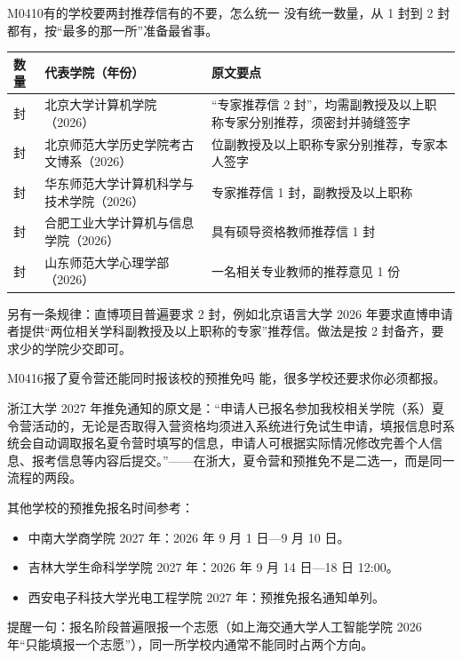 \begin{qa}{M0410}{有的学校要两封推荐信有的不要，怎么统一}
没有统一数量，从 1 封到 2 封都有，按“最多的那一所”准备最省事。

\par\vspace{2pt}\nobreak\begin{center}\footnotesize
\begin{tabularx}{\textwidth}{>{\raggedright\arraybackslash}X>{\raggedright\arraybackslash}X>{\raggedright\arraybackslash}X}
\toprule
\textbf{数量} & \textbf{代表学院（年份）} & \textbf{原文要点} \\ \midrule
2 封 & 北京大学计算机学院（2026） & “专家推荐信 2 封”，均需副教授及以上职称专家分别推荐，须密封并骑缝签字 \\
2 封 & 北京师范大学历史学院考古文博系（2026） & 2 位副教授及以上职称专家分别推荐，专家本人签字 \\
1 封 & 华东师范大学计算机科学与技术学院（2026） & 专家推荐信 1 封，副教授及以上职称 \\
1 封 & 合肥工业大学计算机与信息学院（2026） & 具有硕导资格教师推荐信 1 封 \\
1 封 & 山东师范大学心理学部（2026） & 一名相关专业教师的推荐意见 1 份 \\
\bottomrule
\end{tabularx}
\end{center}\vspace{2pt}\par

另有一条规律：直博项目普遍要求 2 封，例如北京语言大学 2026 年要求直博申请者提供“两位相关学科副教授及以上职称的专家”推荐信。做法是按 2 封备齐，要求少的学院少交即可。
\end{qa}

\begin{qa}{M0416}{报了夏令营还能同时报该校的预推免吗}
能，很多学校还要求你必须都报。

浙江大学 2027 年推免通知的原文是：“申请人已报名参加我校相关学院（系）夏令营活动的，无论是否取得入营资格均须进入系统进行免试生申请，填报信息时系统会自动调取报名夏令营时填写的信息，申请人可根据实际情况修改完善个人信息、报考信息等内容后提交。”——在浙大，夏令营和预推免不是二选一，而是同一流程的两段。

其他学校的预推免报名时间参考：
\begin{itemize}
  \item 中南大学商学院 2027 年：2026 年 9 月 1 日—9 月 10 日。
  \item 吉林大学生命科学学院 2027 年：2026 年 9 月 14 日—18 日 12:00。
  \item 西安电子科技大学光电工程学院 2027 年：预推免报名通知单列。
\end{itemize}

提醒一句：报名阶段普遍限报一个志愿（如上海交通大学人工智能学院 2026 年“只能填报一个志愿”），同一所学校内通常不能同时占两个方向。
\end{qa}

